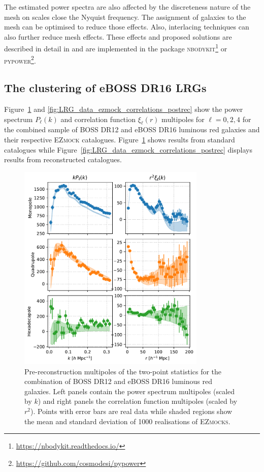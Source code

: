 The estimated power spectra are also affected by the discreteness nature of the mesh on scales close 
the Nyquist frequency. The assignment of galaxies to the mesh can be optimised to reduce those effects. 
Also, interlacing techniques can also further reduce mesh effects. 
These effects and proposed solutions are described in detail in \cite{sefusattiAccurateEstimatorsCorrelation2016}
and are implemented in the package \textsc{nbodykit}\footnote{\url{https://nbodykit.readthedocs.io/}}
or \textsc{pypower}\footnote{\url{https://github.com/cosmodesi/pypower}}. 

\subsection{The clustering of eBOSS DR16 LRGs}
\label{galaxies:clustering:eboss_dr16_lrgs}

Figure~\ref{fig:LRG_data_ezmock_correlations_prerec} and \ref{fig:LRG_data_ezmock_correlations_postrec}
show the power spectrum $P_\ell(k)$ and correlation function $\xi_\ell(r)$ multipoles for $\ell = 0, 2, 4$
for the combined sample of BOSS DR12 and eBOSS DR16 luminous red galaxies and their respective \textsc{EZmock}
catalogues. Figure~\ref{fig:LRG_data_ezmock_correlations_prerec} shows results from standard catalogues while 
Figure~\ref{fig:LRG_data_ezmock_correlations_postrec} displays results from reconstructed catalogues. 

\begin{figure}
    \centering
    \includegraphics[width=0.8\textwidth]{fig/galaxies/DR16LRG_data_ezmock_prerecon.pdf}
    \caption{Pre-reconstruction multipoles of the two-point statistics for the combination of BOSS DR12 and 
    eBOSS DR16 luminous red galaxies. Left panels contain the power spectrum multipoles (scaled by $k$) 
    and right panels the correlation function multipoles (scaled by $r^2$). 
    Points with error bars are real data while shaded regions show the mean and standard deviation 
    of 1000 realisations of \textsc{EZmocks}. 
    }
    \label{fig:LRG_data_ezmock_correlations_prerec}
\end{figure}


